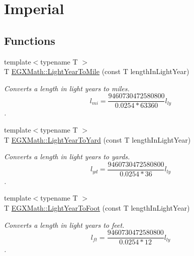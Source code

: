 \hypertarget{group___e_g_x_math-_conversions-_length_conversions-_astronomical-_light_year-_imperial}{}\section{Imperial}
\label{group___e_g_x_math-_conversions-_length_conversions-_astronomical-_light_year-_imperial}
\subsection*{Functions}
\begin{DoxyCompactItemize}
\item 
{\footnotesize template$<$typename T $>$ }\\T \mbox{\hyperlink{group___e_g_x_math-_conversions-_length_conversions-_astronomical-_light_year-_imperial_ga3f6a914c8896334f1be6425107a34827}{E\+G\+X\+Math\+::\+Light\+Year\+To\+Mile}} (const T length\+In\+Light\+Year)
\begin{DoxyCompactList}\small\item\em Converts a length in light years to miles. \[ l_{mi}=\frac{9460730472580800}{0.0254 * 63360} l_{ly} \]. \end{DoxyCompactList}\item 
{\footnotesize template$<$typename T $>$ }\\T \mbox{\hyperlink{group___e_g_x_math-_conversions-_length_conversions-_astronomical-_light_year-_imperial_ga78ce9f584c98c3ad8c4daaebb76030d3}{E\+G\+X\+Math\+::\+Light\+Year\+To\+Yard}} (const T length\+In\+Light\+Year)
\begin{DoxyCompactList}\small\item\em Converts a length in light years to yards. \[ l_{yd}= \frac{9460730472580800}{0.0254 * 36} l_{ly} \]. \end{DoxyCompactList}\item 
{\footnotesize template$<$typename T $>$ }\\T \mbox{\hyperlink{group___e_g_x_math-_conversions-_length_conversions-_astronomical-_light_year-_imperial_gac1d171820f3a01eac5bcb514932a3a17}{E\+G\+X\+Math\+::\+Light\+Year\+To\+Foot}} (const T length\+In\+Light\+Year)
\begin{DoxyCompactList}\small\item\em Converts a length in light years to feet. \[ l_{ft}= \frac{9460730472580800}{0.0254 * 12} l_{ly} \]. \end{DoxyCompactList}\item 

\end{DoxyCompactItemize}
